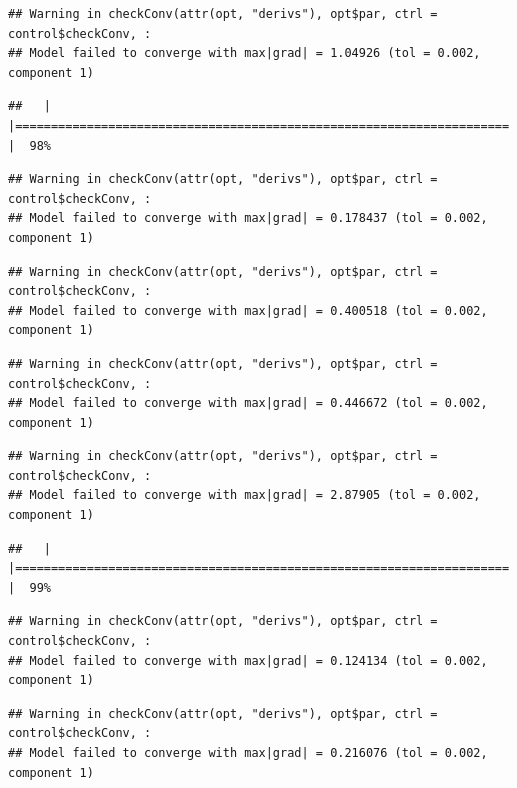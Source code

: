 \documentclass[
  12pt,
]{book}
\begin{document}
\begin{verbatim}
## Warning in checkConv(attr(opt, "derivs"), opt$par, ctrl = control$checkConv, :
## Model failed to converge with max|grad| = 1.04926 (tol = 0.002, component 1)
\end{verbatim}

\begin{verbatim}
##   |                                                                              |===================================================================== |  98%
\end{verbatim}

\begin{verbatim}
## Warning in checkConv(attr(opt, "derivs"), opt$par, ctrl = control$checkConv, :
## Model failed to converge with max|grad| = 0.178437 (tol = 0.002, component 1)
\end{verbatim}

\begin{verbatim}
## Warning in checkConv(attr(opt, "derivs"), opt$par, ctrl = control$checkConv, :
## Model failed to converge with max|grad| = 0.400518 (tol = 0.002, component 1)
\end{verbatim}

\begin{verbatim}
## Warning in checkConv(attr(opt, "derivs"), opt$par, ctrl = control$checkConv, :
## Model failed to converge with max|grad| = 0.446672 (tol = 0.002, component 1)
\end{verbatim}

\begin{verbatim}
## Warning in checkConv(attr(opt, "derivs"), opt$par, ctrl = control$checkConv, :
## Model failed to converge with max|grad| = 2.87905 (tol = 0.002, component 1)
\end{verbatim}

\begin{verbatim}
##   |                                                                              |===================================================================== |  99%
\end{verbatim}

\begin{verbatim}
## Warning in checkConv(attr(opt, "derivs"), opt$par, ctrl = control$checkConv, :
## Model failed to converge with max|grad| = 0.124134 (tol = 0.002, component 1)
\end{verbatim}

\begin{verbatim}
## Warning in checkConv(attr(opt, "derivs"), opt$par, ctrl = control$checkConv, :
## Model failed to converge with max|grad| = 0.216076 (tol = 0.002, component 1)
\end{verbatim}
\end{document}
